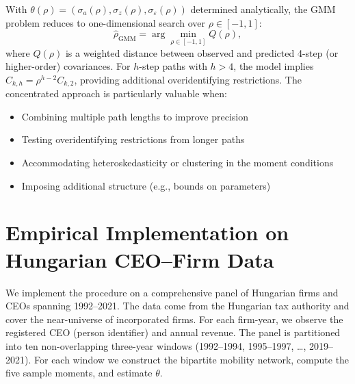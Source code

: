 \documentclass[11pt]{article}
\begin{document}
With $\theta(\rho) = (\sigma_a(\rho), \sigma_z(\rho), \sigma_\varepsilon(\rho))$ determined analytically, the GMM problem reduces to one-dimensional search over $\rho\in[-1,1]$:
\begin{equation}
\label{eq:concentrated-gmm}
 \widehat\rho_{\text{GMM}} = \arg\min_{\rho\in[-1,1]} Q(\rho),
\end{equation}
where $Q(\rho)$ is a weighted distance between observed and predicted 4-step (or higher-order) covariances. For $h$-step paths with $h>4$, the model implies $C_{k,h} = \rho^{h-2} C_{k,2}$, providing additional overidentifying restrictions. The concentrated approach is particularly valuable when:
\begin{itemize}
 \item Combining multiple path lengths to improve precision
 \item Testing overidentifying restrictions from longer paths
 \item Accommodating heteroskedasticity or clustering in the moment conditions
 \item Imposing additional structure (e.g., bounds on parameters)
\end{itemize}

\section{Empirical Implementation on Hungarian CEO--Firm Data}
\label{sec:implementation}
We implement the procedure on a comprehensive panel of Hungarian firms and CEOs spanning 1992--2021. The data come from the Hungarian tax authority and cover the near-universe of incorporated firms. For each firm-year, we observe the registered CEO (person identifier) and annual revenue. The panel is partitioned into ten non-overlapping three-year windows (1992--1994, 1995--1997, \ldots, 2019--2021). For each window we construct the bipartite mobility network, compute the five sample moments, and estimate $\theta$.
\end{document}
